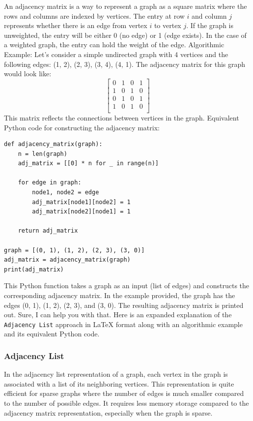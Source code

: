 \documentclass[12pt]{book} %
\begin{document}
An adjacency matrix is a way to represent a graph as a square matrix where the rows and columns are indexed by vertices. The entry at row $i$ and column $j$ represents whether there is an edge from vertex $i$ to vertex $j$. If the graph is unweighted, the entry will be either 0 (no edge) or 1 (edge exists). In the case of a weighted graph, the entry can hold the weight of the edge.
\FloatBarrier
Algorithmic Example:
\FloatBarrier
Let's consider a simple undirected graph with 4 vertices and the following edges: (1, 2), (2, 3), (3, 4), (4, 1).
\FloatBarrier
The adjacency matrix for this graph would look like:
\FloatBarrier
\[
\begin{bmatrix}
0 & 1 & 0 & 1 \\
1 & 0 & 1 & 0 \\
0 & 1 & 0 & 1 \\
1 & 0 & 1 & 0 \\
\end{bmatrix}
\]
\FloatBarrier
This matrix reflects the connections between vertices in the graph.
\FloatBarrier
Equivalent Python code for constructing the adjacency matrix:
\FloatBarrier
\begin{lstlisting}
def adjacency_matrix(graph):
    n = len(graph)
    adj_matrix = [[0] * n for _ in range(n)]
    
    for edge in graph:
        node1, node2 = edge
        adj_matrix[node1][node2] = 1
        adj_matrix[node2][node1] = 1
    
    return adj_matrix

graph = [(0, 1), (1, 2), (2, 3), (3, 0)]
adj_matrix = adjacency_matrix(graph)
print(adj_matrix)
\end{lstlisting}
\FloatBarrier
This Python function takes a graph as an input (list of edges) and constructs the corresponding adjacency matrix. In the example provided, the graph has the edges (0, 1), (1, 2), (2, 3), and (3, 0). The resulting adjacency matrix is printed out.
Sure, I can help you with that. Here is an expanded explanation of the \texttt{Adjacency List} approach in LaTeX format along with an algorithmic example and its equivalent Python code.

\subsubsection{Adjacency List}

In the adjacency list representation of a graph, each vertex in the graph is associated with a list of its neighboring vertices. This representation is quite efficient for sparse graphs where the number of edges is much smaller compared to the number of possible edges. It requires less memory storage compared to the adjacency matrix representation, especially when the graph is sparse.
\end{document}
